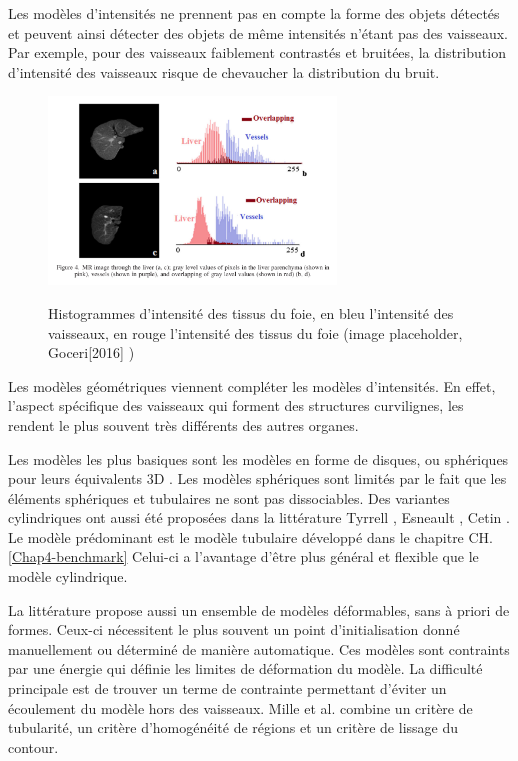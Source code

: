 Les modèles d'intensités ne prennent pas en compte la forme des objets détectés et peuvent ainsi détecter des objets de même intensités n'étant pas des vaisseaux. Par exemple, pour des vaisseaux faiblement contrastés et bruitées, la distribution d'intensité des vaisseaux risque de chevaucher la distribution du bruit.

\begin{figure}
  \centering
  \includegraphics[height=5cm]{Images/Goceri[2016].png}
  \label{fig:overlap_vessels_tissues}
  \caption{Histogrammes d'intensité des tissus du foie, en bleu l'intensité des vaisseaux, en rouge l'intensité des tissus du foie (image placeholder, Goceri[2016] ) }
\end{figure}

Les modèles géométriques viennent compléter les modèles d'intensités. En effet, l'aspect spécifique des vaisseaux qui forment des structures curvilignes, les rendent le plus souvent très différents des autres organes.

Les modèles les plus basiques sont les modèles en forme de disques, ou sphériques pour leurs équivalents 3D \cite{Law2008_OOF}. Les modèles sphériques sont limités par le fait que les éléments sphériques et tubulaires ne sont pas dissociables. Des variantes cylindriques ont aussi été proposées dans la littérature Tyrrell \cite{Tyrrell2007_superEllipoid}, Esneault \cite{Esneault2009_moments_graph_cut}, Cetin \cite{Cetin2015_high_order}. Le modèle prédominant est le modèle tubulaire  développé dans le chapitre CH.\ref{Chap4-benchmark} Celui-ci a l'avantage d'être plus général et flexible que le modèle cylindrique.

La littérature propose aussi un ensemble de modèles déformables, sans à priori de formes. Ceux-ci nécessitent le plus souvent un point d'initialisation donné manuellement ou déterminé de manière automatique. Ces modèles sont contraints par une énergie qui définie les limites de déformation du modèle. La difficulté principale est de trouver un terme de contrainte permettant d'éviter un écoulement du modèle hors des vaisseaux. Mille et al. \cite{Mille2009_deformable} combine un critère de tubularité, un critère d'homogénéité de régions et un critère de lissage du contour. 

